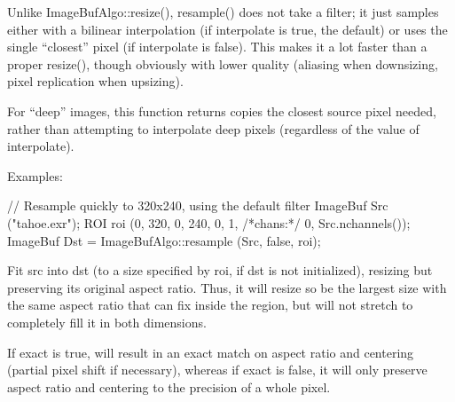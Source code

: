 Unlike {\cf ImageBufAlgo::resize()}, {\cf resample()} does not take a filter; it
just samples either with a bilinear interpolation (if {\cf interpolate} is
{\cf true}, the default) or uses the single ``closest'' pixel (if
{\cf interpolate} is {\cf false}).  This makes it a lot faster than a proper
{\cf resize()}, though obviously with lower quality (aliasing when
downsizing, pixel replication when upsizing).

For ``deep'' images, this function returns copies the closest source pixel
needed, rather than attempting to interpolate deep pixels (regardless of the
value of {\cf interpolate}).

\smallskip
\noindent Examples:
\begin{code}
    // Resample quickly to 320x240, using the default filter
    ImageBuf Src ("tahoe.exr");
    ROI roi (0, 320, 0, 240, 0, 1, /*chans:*/ 0, Src.nchannels());
    ImageBuf Dst = ImageBufAlgo::resample (Src, false, roi);
\end{code}
\apiend


 

Fit {\cf src} into {\cf dst} (to a size specified by {\cf roi}, if {\cf dst}
is not initialized), resizing but preserving its original aspect ratio.
Thus, it will resize so be the largest size with the same aspect ratio that
can fix inside the region, but will not stretch to completely fill it in
both dimensions.

If {\cf exact} is true, will result in an exact match on aspect ratio and
centering (partial pixel shift if necessary), whereas if {\cf exact} is
false, it will only preserve aspect ratio and centering to the precision of
a whole pixel.

